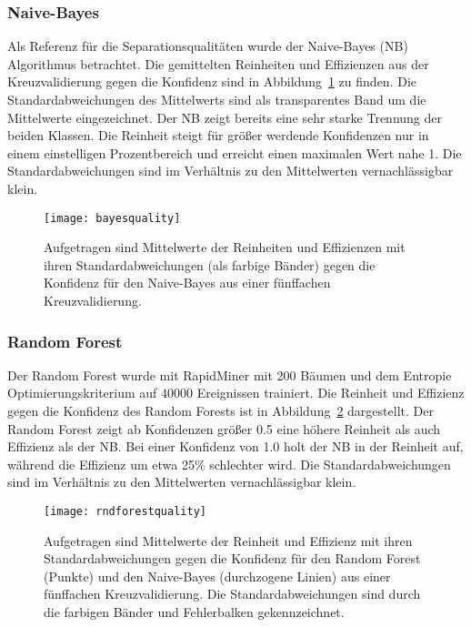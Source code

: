 \subsubsection{Naive-Bayes}
Als Referenz für die Separationsqualitäten wurde der Naive-Bayes (NB) Algorithmus betrachtet.
Die gemittelten Reinheiten und Effizienzen aus der Kreuzvalidierung gegen die Konfidenz sind in Abbildung~\ref{naivebayes} zu finden.
Die Standardabweichungen des Mittelwerts sind als transparentes Band um die Mittelwerte eingezeichnet.
Der NB zeigt bereits eine sehr starke Trennung der beiden Klassen.
Die Reinheit steigt für größer werdende Konfidenzen nur in einem einstelligen Prozentbereich und erreicht einen maximalen Wert nahe 1.
Die Standardabweichungen sind im Verhältnis zu den Mittelwerten vernachlässigbar klein.
\begin{figure}
  \centering
  \texttt{[image: bayesquality]}
\vspace{-1em}
    \caption{Aufgetragen sind Mittelwerte der Reinheiten und Effizienzen mit ihren Standardabweichungen (als farbige Bänder) gegen die Konfidenz für den Naive-Bayes aus einer fünffachen Kreuzvalidierung.}
  \label{naivebayes}
\end{figure}

\subsubsection{Random Forest}
Der Random Forest wurde mit RapidMiner mit 200 Bäumen und dem Entropie Optimierungskriterium auf $\num{40000}$ Ereignissen trainiert.
Die Reinheit und Effizienz gegen die Konfidenz des Random Forests ist in Abbildung~\ref{figrndforestquality} dargestellt.
Der Random Forest zeigt ab Konfidenzen größer 0.5 eine höhere Reinheit als auch Effizienz als der NB.
Bei einer Konfidenz von 1.0 holt der NB in der Reinheit auf, während die Effizienz um etwa 25\% schlechter wird.
Die Standardabweichungen sind im Verhältnis zu den Mittelwerten vernachlässigbar klein.
\begin{figure}
  \centering
  \texttt{[image: rndforestquality]}
\vspace{-1em}
    \caption{Aufgetragen sind Mittelwerte der Reinheit und Effizienz mit ihren Standardabweichungen gegen die Konfidenz für den Random Forest (Punkte) und den Naive-Bayes (durchzogene Linien) aus einer fünffachen Kreuzvalidierung. Die Standardabweichungen sind durch die farbigen Bänder und Fehlerbalken gekennzeichnet.}
  \label{figrndforestquality}
\end{figure}



